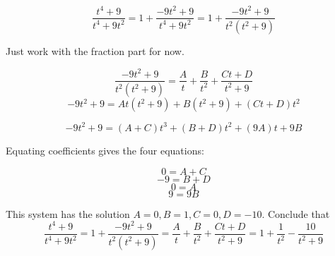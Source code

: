 \documentclass[11pt]{article}
\begin{document}
$$\frac{t^4+9}{t^4+9t^2} = 1 + \frac{-9t^2+9}{t^4+9t^2} = 1 + \frac{-9t^2+9}{t^2(t^2+9)}$$

Just work with the fraction part for now.

$$ \frac{-9t^2+9}{t^2(t^2+9)} = \frac{A}{t} + \frac{B}{t^2} + 
\frac{Ct + D}{t^2+9}$$
$$-9t^2 + 9 = At(t^2+9) + B(t^2+9) + (Ct+D)t^2$$

$$-9t^2 + 9 = (A+C)t^3 + (B+D)t^2 + (9A)t + 9B$$

Equating coefficients gives the four equations:

$$0 = A+C$$
$$-9 = B+D$$
$$0 = A$$
$$9 = 9B$$

This system has the solution $A = 0, B = 1, C = 0, D = -10$. Conclude that 
$$\frac{t^4+9}{t^4+9t^2} = 1 + \frac{-9t^2+9}{t^2(t^2+9)} = \frac{A}{t} + \frac{B}{t^2} + 
\frac{Ct + D}{t^2+9} = 1 + \frac{1}{t^2} - \frac{10}{t^2+9}$$
\end{document}
